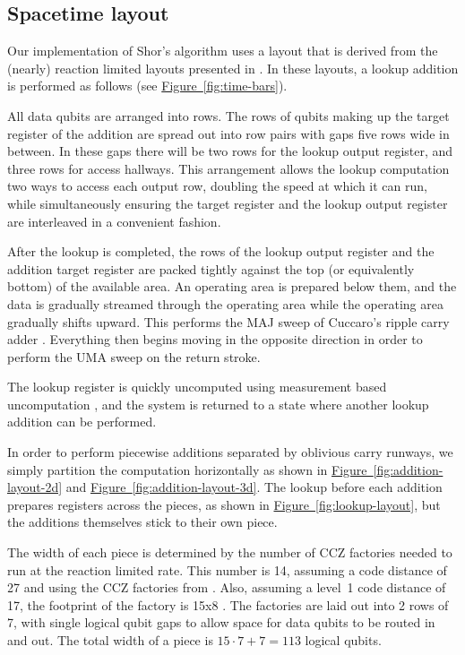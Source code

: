 \documentclass[superscriptaddress,notitlepage,longbibliography]{revtex4-1}
\theoremstyle{definition}
\theoremstyle{definition}
\newcommand{\fig}[1]{\hyperref[fig:#1]{Figure~\ref*{fig:#1}}}
\begin{document}
\subsection{Spacetime layout}

Our implementation of Shor's algorithm uses a layout that is derived from the (nearly) reaction limited layouts presented in \cite{gidney2019autoccz}.
In these layouts, a lookup addition is performed as follows (see \fig{time-bars}).

All data qubits are arranged into rows.
The rows of qubits making up the target register of the addition are spread out into row pairs with gaps five rows wide in between.
In these gaps there will be two rows for the lookup output register, and three rows for access hallways.
This arrangement allows the lookup computation two ways to access each output row, doubling the speed at which it can run, while simultaneously ensuring the target register and the lookup output register are interleaved in a convenient fashion.

After the lookup is completed, the rows of the lookup output register and the addition target register are packed tightly against the top (or equivalently bottom) of the available area.
An operating area is prepared below them, and the data is gradually streamed through the operating area while the operating area gradually shifts upward.
This performs the MAJ sweep of Cuccaro's ripple carry adder \cite{cuccaro2004adder}.
Everything then begins moving in the opposite direction in order to perform the UMA sweep on the return stroke.

The lookup register is quickly uncomputed using measurement based uncomputation \cite{berry2019qubitization}, and the system is returned to a state where another lookup addition can be performed.

In order to perform piecewise additions separated by oblivious carry runways, we simply partition the computation horizontally as shown in \fig{addition-layout-2d} and \fig{addition-layout-3d}.
The lookup before each addition prepares registers across the pieces, as shown in \fig{lookup-layout}, but the additions themselves stick to their own piece.

The width of each piece is determined by the number of CCZ factories needed to run at the reaction limited rate.
This number is 14, assuming a code distance of 27 and using the CCZ factories from \cite{gidney2019autoccz, gidney2018magic}.
Also, assuming a level~1 code distance of 17, the footprint of the factory is 15x8 \cite{gidney2019autoccz}.
The factories are laid out into 2 rows of 7, with single logical qubit gaps to allow space for data qubits to be routed in and out.
The total width of a piece is $15\cdot 7 + 7 = 113$ logical qubits.
\end{document}
